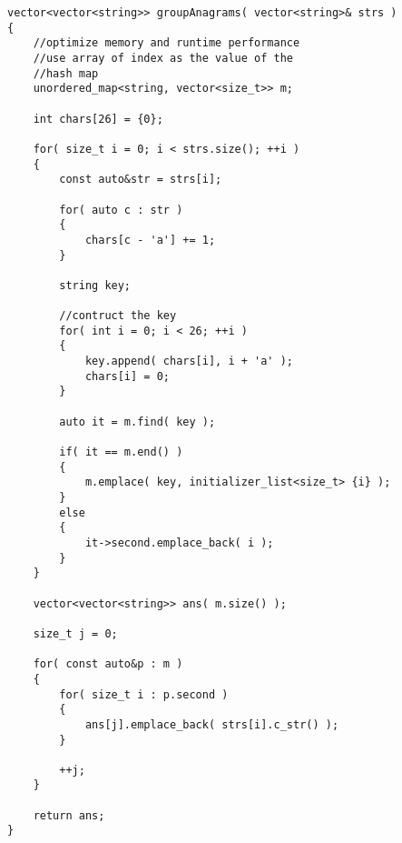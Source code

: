 \setcounter{lstlisting}{0}
\begin{lstlisting}[style=customc, caption={Counting Sort}]
vector<vector<string>> groupAnagrams( vector<string>& strs )
{
    //optimize memory and runtime performance
    //use array of index as the value of the
    //hash map
    unordered_map<string, vector<size_t>> m;

    int chars[26] = {0};

    for( size_t i = 0; i < strs.size(); ++i )
    {
        const auto&str = strs[i];

        for( auto c : str )
        {
            chars[c - 'a'] += 1;
        }

        string key;

        //contruct the key
        for( int i = 0; i < 26; ++i )
        {
            key.append( chars[i], i + 'a' );
            chars[i] = 0;
        }

        auto it = m.find( key );

        if( it == m.end() )
        {
            m.emplace( key, initializer_list<size_t> {i} );
        }
        else
        {
            it->second.emplace_back( i );
        }
    }

    vector<vector<string>> ans( m.size() );

    size_t j = 0;

    for( const auto&p : m )
    {
        for( size_t i : p.second )
        {
            ans[j].emplace_back( strs[i].c_str() );
        }

        ++j;
    }

    return ans;
}
\end{lstlisting}